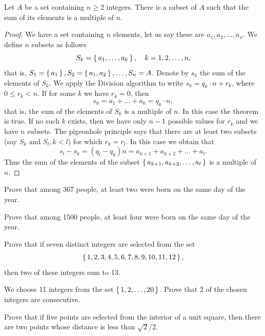 \begin{proposition}
Let $A$ be a set containing $n\geq 2$ integers. There is a subset of $A$ such that the sum of its elements is a 
multiple of $n$.
\end{proposition}
\begin{proof}
We have a set containing $n$ elements, let us say these are $a_1,a_2,\ldots,a_n$. We define $n$ subsets as follows
$$
S_k=\left\{\,a_1,\ldots,a_k\,\right\},\quad k=1,2,\ldots,n,
$$
that is, $S_1=\left\{\,a_1\,\right\}, S_2=\left\{\,a_1,a_2\,\right\},\ldots,S_n=A$. Denote by $s_k$ the sum of the elements of $S_k$. We apply the
Division algorithm to write $s_k=q_k\cdot n+r_k$, where $0\leq r_k<n$. If for some $k$ we have $r_k=0$, then
$$
s_k=a_1+\ldots+a_k=q_k\cdot n,
$$
that is, the sum of the elements of $S_k$ is a multiple of $n$. In this case the theorem is true. If no such
$k$ exists, then we have only $n-1$ possible values for $r_k$ and we have $n$ subsets. The pigeonhole principle says
that there are at least two subsets (say $S_k$ and $S_l, k<l$) for which $r_k=r_l$. In this case we obtain that
$$
s_l-s_k=(q_l-q_k)n=a_{k+1}+a_{k+2}+\ldots+a_l.
$$
Thus the sum of the elements of the subset $\left\{\,a_{k+1},a_{k+2},\ldots,a_l\,\right\}$ is a multiple of $n$.
\end{proof}

\begin{exercise}\label{pigeon-0a}
Prove that among 367 people, at least two were born on the same day of the year.
\end{exercise}

\begin{exercise}\label{pigeon-0b}
Prove that among 1500 people, at least four were born on the same day of the year.
\end{exercise}


\begin{exercise}\label{pigeon-1}
Prove that if seven distinct integers are selected from the set $$\left\{\,1,2,3,4,5,6,7,8,9,10,11,12\,\right\},$$
then two of these integers sum to 13.
\end{exercise}

\begin{exercise}\label{pigeon-2}
We choose 11 integers from the set $\left\{\,1,2,\ldots,20\,\right\}$. Prove that 2 of the chosen
integers are consecutive.
\end{exercise}

\begin{exercise}\label{pigeon-3}
 Prove that if five points are selected from the interior of a unit square, then there are two points whose distance is less than
$\sqrt{2}/2$.
\end{exercise}

